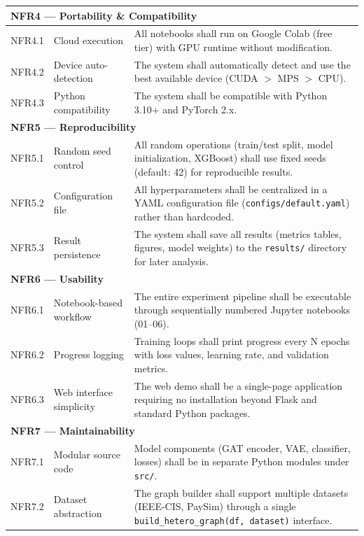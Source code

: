 \begin{table}[h!]
\begin{tabular}{|c|p{4cm}|p{8cm}|}
\multicolumn{3}{|l|}{\textbf{NFR4 — Portability \& Compatibility}} \\
\hline
NFR4.1 & Cloud execution & All notebooks shall run on Google Colab (free tier) with GPU runtime without modification. \\
\hline
NFR4.2 & Device auto-detection & The system shall automatically detect and use the best available device (CUDA $>$ MPS $>$ CPU). \\
\hline
NFR4.3 & Python compatibility & The system shall be compatible with Python 3.10+ and PyTorch 2.x. \\
\hline

\multicolumn{3}{|l|}{\textbf{NFR5 — Reproducibility}} \\
\hline
NFR5.1 & Random seed control & All random operations (train/test split, model initialization, XGBoost) shall use fixed seeds (default: 42) for reproducible results. \\
\hline
NFR5.2 & Configuration file & All hyperparameters shall be centralized in a YAML configuration file (\texttt{configs/default.yaml}) rather than hardcoded. \\
\hline
NFR5.3 & Result persistence & The system shall save all results (metrics tables, figures, model weights) to the \texttt{results/} directory for later analysis. \\
\hline

\multicolumn{3}{|l|}{\textbf{NFR6 — Usability}} \\
\hline
NFR6.1 & Notebook-based workflow & The entire experiment pipeline shall be executable through sequentially numbered Jupyter notebooks (01--06). \\
\hline
NFR6.2 & Progress logging & Training loops shall print progress every N epochs with loss values, learning rate, and validation metrics. \\
\hline
NFR6.3 & Web interface simplicity & The web demo shall be a single-page application requiring no installation beyond Flask and standard Python packages. \\
\hline

\multicolumn{3}{|l|}{\textbf{NFR7 — Maintainability}} \\
\hline
NFR7.1 & Modular source code & Model components (GAT encoder, VAE, classifier, losses) shall be in separate Python modules under \texttt{src/}. \\
\hline
NFR7.2 & Dataset abstraction & The graph builder shall support multiple datasets (IEEE-CIS, PaySim) through a single \texttt{build\_hetero\_graph(df, dataset)} interface. \\
\hline

\end{tabular}
\end{table}

